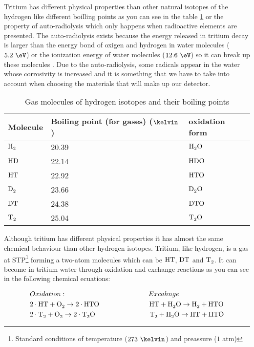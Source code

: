 Tritium has different physical properties than other natural isotopes of the hydrogen like different boilling points as you can see in the table \ref{tab:BoillingPoints} or the property of auto-radiolysis which only happens when radioactive elements are presented. The auto-radiolysis exists because the energy released in tritium decay is larger than the energy bond of oxigen and hydrogen in water molecules ($5.2~\eV$) or the ionization energy of water molecules ($12.6~\eV$) so it can break up these molecules \cite{AutoRadyolisis}. Due to the auto-radiolysis, some radicals appear in the water whose corrosivity is increased and it is something that we have to take into account when choosing the materials that will make up our detector.

\begin{table}[htbp]
\begin{center}
\begin{tabular}{|l|l|l|}
\hline
Molecule & Boiling point (for gases) ($\kelvin$) & oxidation form\\
\hline \hline \hline
$\ce{H_2}$ & 20.39 & $\ce{H_2 O}$ \\ \hline
$\ce{HD}$ & 22.14 & $\ce{HDO}$ \\ \hline
$\ce{HT}$ & 22.92 & $\ce{HTO}$ \\ \hline
$\ce{D_2}$ & 23.66 & $\ce{D_2 O}$ \\ \hline
$\ce{DT}$ & 24.38 & $\ce{DTO}$ \\ \hline
$\ce{T_2}$ & 25.04 & $\ce{T_2 O}$ \\ \hline
\end{tabular}
\caption{Gas molecules of hydrogen isotopes and their boiling points}
\label{tab:BoillingPoints}
\end{center}
\end{table}

Although tritium has different physical properties it has almost the same chemical behaviour than other hydrogen isotopes. Tritium, like hydrogen, is a gas at STP\footnote{Standard conditions of temperature ($273~\kelvin$) and preassure ($1$ atm)} forming a two-atom molecules which can be $\ce{HT}$, $\ce{DT}$ and $\ce{T_2}$. It can become in tritium water through oxidation and exchange reactions as you can see in the following chemical ecuations\cite{TritiumHandling}:

\begin{equation}
\begin{split}
& Oxidation: \qquad \qquad \qquad \qquad \qquad \qquad Excahnge\\
& 2\cdot{}\ce{HT} + \ce{O_2} \rightarrow 2 \cdot{} \ce{HTO} ~ \quad \qquad \qquad \qquad \ce{HT} + \ce{H_2 O} \rightarrow \ce{H_2} + \ce{HTO}\\
& 2\cdot{}\ce{T_2} + \ce{O_2} \rightarrow 2 \cdot{} \ce{T_2 O} \qquad \qquad \qquad \qquad \ce{T_2} + \ce{H_2 O} \rightarrow \ce{HT} + \ce{HTO}
\label{eq:OxidationExchange}
\end{split}
\end{equation}

